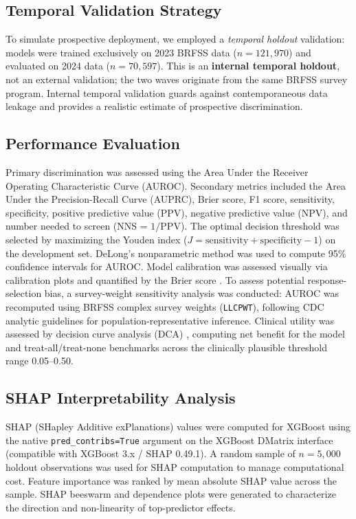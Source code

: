 \documentclass[12pt,a4paper]{article}
\begin{document}
\subsection{Temporal Validation Strategy}

To simulate prospective deployment, we employed a \textit{temporal holdout}
validation: models were trained exclusively on 2023 BRFSS data ($n = 121{,}970$)
and evaluated on 2024 data ($n = 70{,}597$). This is an \textbf{internal
temporal holdout}, not an external validation; the two waves originate from the
same BRFSS survey program. Internal temporal validation guards against
contemporaneous data leakage and provides a realistic estimate of prospective
discrimination.

\subsection{Performance Evaluation}

Primary discrimination was assessed using the Area Under the Receiver Operating
Characteristic Curve (AUROC). Secondary metrics included the Area Under the
Precision-Recall Curve (AUPRC), Brier score, F1 score, sensitivity,
specificity, positive predictive value (PPV), negative predictive value (NPV),
and number needed to screen (NNS = $1/\text{PPV}$). The optimal decision
threshold was selected by maximizing the Youden index ($J = \text{sensitivity}
+ \text{specificity} - 1$) on the development set. DeLong's nonparametric method
\cite{DeLong1988} was used to compute 95\% confidence intervals for AUROC.
Model calibration was assessed visually via calibration plots and quantified by
the Brier score \cite{Steyerberg2010}.
To assess potential response-selection bias, a survey-weight
sensitivity analysis was conducted: AUROC was recomputed using BRFSS
complex survey weights (\texttt{LLCPWT}), following CDC analytic guidelines
for population-representative inference.
Clinical utility was assessed by decision curve analysis (DCA) \cite{Vickers2006},
computing net benefit for the model and treat-all/treat-none
benchmarks across the clinically plausible threshold range 0.05--0.50.

\subsection{SHAP Interpretability Analysis}

SHAP (SHapley Additive exPlanations) values \cite{LundbergLee2017} were
computed for XGBoost using the native \texttt{pred\_contribs=True} argument on
the XGBoost DMatrix interface (compatible with XGBoost 3.x / SHAP 0.49.1). A
random sample of $n = 5{,}000$ holdout observations was used for SHAP
computation to manage computational cost. Feature importance was ranked by mean
absolute SHAP value across the sample. SHAP beeswarm and dependence plots were
generated to characterize the direction and non-linearity of top-predictor effects.
\end{document}
